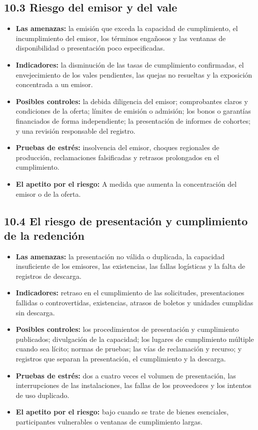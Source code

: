 \documentclass[11pt]{article}
\begin{document}
\subsection*{10.3 Riesgo del emisor y del vale}

\begin{itemize}[leftmargin=*]
\item \textbf{Las amenazas:} la emisión que exceda la capacidad de cumplimiento, el incumplimiento del emisor, los términos engañosos y las ventanas de disponibilidad o presentación poco especificadas.
\item \textbf{Indicadores:} la disminución de las tasas de cumplimiento confirmadas, el envejecimiento de los vales pendientes, las quejas no resueltas y la exposición concentrada a un emisor.
\item \textbf{Posibles controles:} la debida diligencia del emisor; comprobantes claros y condiciones de la oferta; límites de emisión o admisión; los bonos o garantías financiados de forma independiente; la presentación de informes de cohortes; y una revisión responsable del registro.
\item \textbf{Pruebas de estrés:} insolvencia del emisor, choques regionales de producción, reclamaciones falsificadas y retrasos prolongados en el cumplimiento.
\item \textbf{El apetito por el riesgo:} A medida que aumenta la concentración del emisor o de la oferta.
\end{itemize}
\subsection*{10.4 El riesgo de presentación y cumplimiento de la redención}

\begin{itemize}[leftmargin=*]
\item \textbf{Las amenazas:} la presentación no válida o duplicada, la capacidad insuficiente de los emisores, las existencias, las fallas logísticas y la falta de registros de descarga.
\item \textbf{Indicadores:} retraso en el cumplimiento de las solicitudes, presentaciones fallidas o controvertidas, existencias, atrasos de boletos y unidades cumplidas sin descarga.
\item \textbf{Posibles controles:} los procedimientos de presentación y cumplimiento publicados; divulgación de la capacidad; los lugares de cumplimiento múltiple cuando sea lícito; normas de pruebas; las vías de reclamación y recurso; y registros que separan la presentación, el cumplimiento y la descarga.
\item \textbf{Pruebas de estrés:} dos a cuatro veces el volumen de presentación, las interrupciones de las instalaciones, las fallas de los proveedores y los intentos de uso duplicado.
\item \textbf{El apetito por el riesgo:} bajo cuando se trate de bienes esenciales, participantes vulnerables o ventanas de cumplimiento largas.
\end{itemize}
\end{document}
